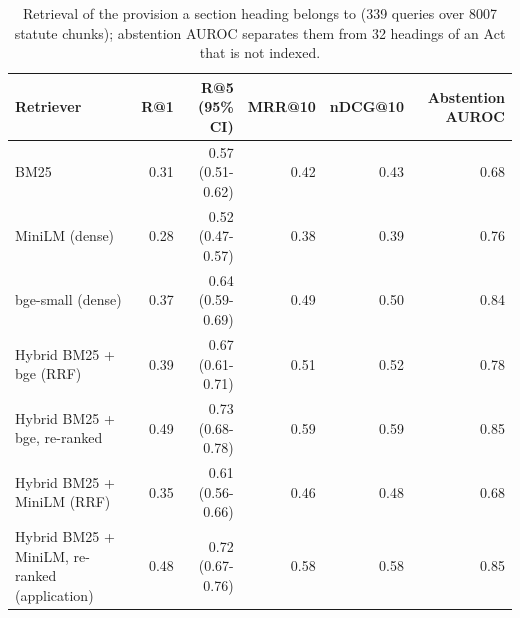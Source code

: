 \begin{table}[t]
\centering\small
\caption{Retrieval of the provision a section heading belongs to (339 queries over 8007 statute chunks); abstention AUROC separates them from 32 headings of an Act that is not indexed.}
\label{tab:rag}
\begin{tabular}{lrrrrr}
\toprule
Retriever & R@1 & R@5 (95\% CI) & MRR@10 & nDCG@10 & Abstention AUROC \\
\midrule
BM25 & 0.31 & 0.57 (0.51-0.62) & 0.42 & 0.43 & 0.68 \\
MiniLM (dense) & 0.28 & 0.52 (0.47-0.57) & 0.38 & 0.39 & 0.76 \\
bge-small (dense) & 0.37 & 0.64 (0.59-0.69) & 0.49 & 0.50 & 0.84 \\
Hybrid BM25 + bge (RRF) & 0.39 & 0.67 (0.61-0.71) & 0.51 & 0.52 & 0.78 \\
Hybrid BM25 + bge, re-ranked & 0.49 & 0.73 (0.68-0.78) & 0.59 & 0.59 & 0.85 \\
Hybrid BM25 + MiniLM (RRF) & 0.35 & 0.61 (0.56-0.66) & 0.46 & 0.48 & 0.68 \\
Hybrid BM25 + MiniLM, re-ranked (application) & 0.48 & 0.72 (0.67-0.76) & 0.58 & 0.58 & 0.85 \\
\bottomrule
\end{tabular}
\end{table}
